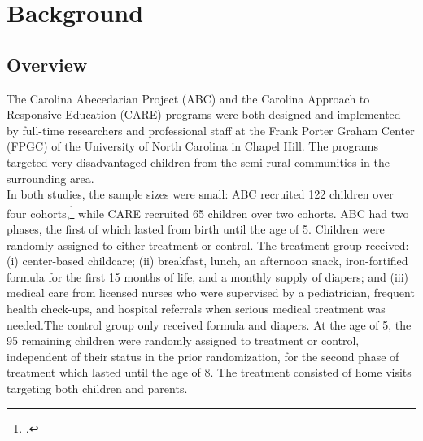\singlespacing
\pagebreak
\tableofcontents
\listoffigures
\listoftables
\pagebreak

\section{Background} \label{section:background}
\subsection{Overview}

\noindent The Carolina Abecedarian Project (ABC) and the Carolina Approach to Responsive Education (CARE) programs were both designed and implemented by full-time researchers and professional staff at the Frank Porter Graham Center (FPGC) of the University of North Carolina in Chapel Hill. The programs targeted very disadvantaged children from the semi-rural communities in the surrounding area.\\

\noindent In both studies, the sample sizes were small: ABC recruited 122 children over four cohorts,\footnote{\citet{Ramey_Collier_etal_1976_CarolinaAbecedarianProject}.} while CARE recruited 65 children over two cohorts. ABC had two phases, the first of which lasted from birth until the age of 5. Children were randomly assigned to either treatment or control. The treatment group received: (i) center-based childcare; (ii) breakfast, lunch, an afternoon snack, iron-fortified formula for the first 15 months of life, and a monthly supply of diapers; and (iii) medical care from licensed nurses who were supervised by a pediatrician, frequent health check-ups, and hospital referrals when serious medical treatment was needed.The control group only received formula and diapers. At the age of 5, the 95 remaining children were randomly assigned to treatment or control, independent of their status in the prior randomization, for the second phase of treatment which lasted until the age of 8. The treatment consisted of home visits targeting both children and parents.\\ 

